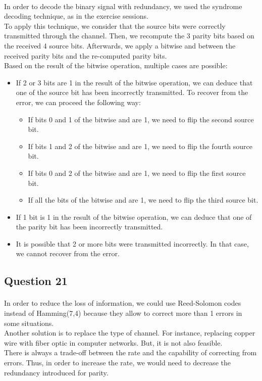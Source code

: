 \documentclass[a4paper, 11pt, oneside]{article}
\begin{document}
\paragraph{}In order to decode the binary signal with redundancy, we used the syndrome decoding technique, as in the exercise sessions.\\
To apply this technique, we consider that the source bits were correctly transmitted through the channel. Then, we recompute the 3 parity bits based on the received 4 source bits.
Afterwards, we apply a bitwise and between the received parity bits and the re-computed parity bits.\\
Based on the result of the bitwise operation, multiple cases are possible:
\begin{itemize}
    \item If 2 or 3 bits are 1 in the result of the bitwise operation, we can deduce that one of the source bit has been incorrectly transmitted.
    To recover from the error, we can proceed the following way:
        \begin{itemize}
            \item If bits 0 and 1 of the bitwise and are 1, we need to flip the second source bit.
            \item If bits 1 and 2 of the bitwise and are 1, we need to flip the fourth source bit.
            \item If bits 0 and 2 of the bitwise and are 1, we need to flip the first source bit.
            \item If all the bits of the bitwise and are 1, we need to flip the third source bit.
        \end{itemize}
    \item If 1 bit is 1 in the result of the bitwise operation, we can deduce that one of the parity bit has been incorrectly transmitted.
    \item It is possible that 2 or more bits were transmitted incorrectly. In that case, we cannot recover from the error.
\end{itemize}


\subsection{Question 21}
\paragraph{}In order to reduce the loss of information, we could use Reed-Solomon codes instead of Hamming(7,4) because they allow to correct more than 1 errors
in some situations.\\
Another solution is to replace the type of channel. For instance, replacing copper wire with fiber optic in computer networks.
But, it is not also feasible.\\
There is always a trade-off between the rate and the capability of correcting from errors. Thus, in order to increase the rate,
we would need to decrease the redundancy introduced for parity.
\end{document}

